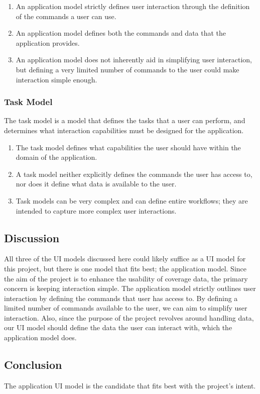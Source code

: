 \documentclass[onecolumn, draftclsnofoot,10pt, compsoc]{IEEEtran}
\begin{document}
\begin{enumerate}
\item An application model strictly defines user interaction through the definition of the commands a user can use.
\item An application model defines both the commands and data that the application provides.
\item An application model does not inherently aid in simplifying user interaction, but defining a very limited number of commands to the user could make interaction simple enough.
\end{enumerate}

\subsubsection{Task Model}
The task model is a model that defines the tasks that a user can perform, and determines what interaction capabilities must be designed for the application.

\begin{enumerate}
\item The task model defines what capabilities the user should have within the domain of the application.
\item A task model neither explicitly defines the commands the user has access to, nor does it define what data is available to the user.
\item Task models can be very complex and can define entire workflows; they are intended to capture more complex user interactions.
\end{enumerate}

\subsection{Discussion}
All three of the UI models discussed here could likely suffice as a UI model for this project, but there is one model that fits best; the application model. Since the aim of the project is to enhance the usability of coverage data, the primary concern is keeping interaction simple. The application model strictly outlines user interaction by defining the commands that user has access to. By defining a limited number of commands available to the user, we can aim to simplify user interaction. Also, since the purpose of the project revolves around handling data, our UI model should define the data the user can interact with, which the application model does.

\subsection{Conclusion}
The application UI model is the candidate that fits best with the project’s intent.
\end{document}
